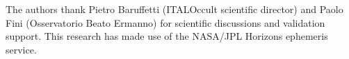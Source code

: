 The authors thank Pietro Baruffetti (ITALOccult scientific director)
and Paolo Fini (Osservatorio Beato Ermanno) for scientific discussions
and validation support.
This research has made use of the NASA/JPL Horizons ephemeris service.
